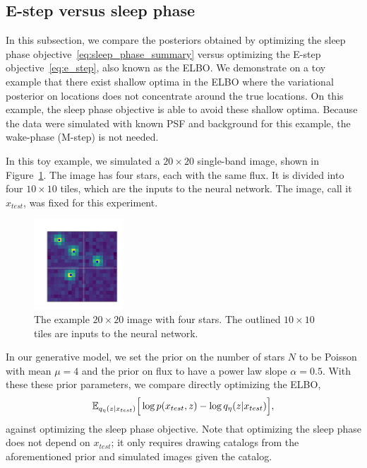 \subsection{E-step versus sleep phase}
\label{sec:estep_sleep_compare}

In this subsection, we compare the posteriors obtained by optimizing the sleep phase objective~\eqref{eq:sleep_phase_summary} 
versus optimizing the E-step objective~\eqref{eq:e_step}, also known as the ELBO. 
We demonstrate on a toy example that there exist shallow optima in the ELBO where the variational posterior on locations does not concentrate around the true locations.
On this example, the sleep phase objective is able to avoid these shallow optima. 
Because the data were simulated with known PSF and background for this example, the wake-phase (M-step) is not needed. 

In this toy example, we simulated a $20\times20$ single-band image, shown in Figure~\ref{fig:toy_example}.
The image has four stars, each with the same flux. It is divided into four $10\times 10$ tiles, which are the inputs to the neural network. The image, call it $x_{test}$, was fixed for this experiment. 

\begin{figure}[!h]
    \centering
    \vspace{-1em}
    \includegraphics[width = 0.3\textwidth]{figures/vi_sleep_ex_figure.png}
    \vspace{-1.7em}
    \caption{The example $20\times 20$ image with four stars. The outlined $10\times 10$ tiles are inputs to the neural network. }
    \label{fig:toy_example}
\end{figure}

In our generative model, we set the prior on the number of stars $N$ to be Poisson with mean $\mu = 4$ and the prior on flux to have a power law slope $\alpha = 0.5$. 
With these these prior parameters, we compare directly optimizing the ELBO, 
\begin{align}
\mathbb{E}_{q_{\eta}(z | x_{test})}\Big[\log p(x_{test}, z) - \log q_{\eta}(z | x_{test})\Big],
\label{eq:elbo_on_test}
\end{align}
against optimizing the sleep phase objective. Note that optimizing the sleep phase does not depend on $x_{test}$; it only requires drawing catalogs from the aforementioned prior and simulated images given the catalog. 


